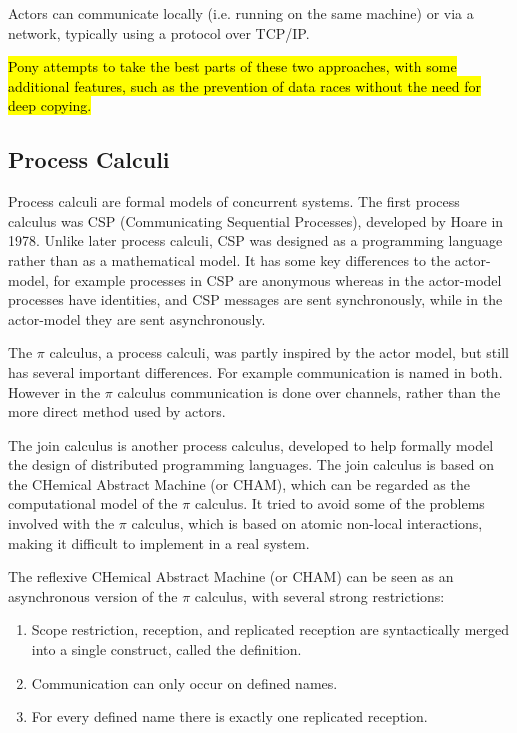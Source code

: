 \documentclass[11pt,a4paper]{report}
\begin{document}
Actors can communicate locally (i.e. running on the same machine) or via a network, typically using a protocol over TCP/IP.

\hl{Pony attempts to take the best parts of these two approaches, with some additional features, such as the prevention of data races without the need for deep copying.}

\subsection{Process Calculi}

Process calculi are formal models of concurrent systems.
The first process calculus was CSP (Communicating Sequential Processes), developed by Hoare in 1978\cite{hoare1978}.
Unlike later process calculi, CSP was designed as a programming language rather than as a mathematical model.
It has some key differences to the actor-model, for example processes in CSP are anonymous whereas in the actor-model processes have identities, and CSP messages are sent synchronously, while in the actor-model they are sent asynchronously.

The $\pi$ calculus\cite{milner1999communicating}, a process calculi, was partly inspired by the actor model, but still has several important differences.
For example communication is named in both.
However in the $\pi$ calculus communication is done over channels, rather than the more direct method used by actors.

The join calculus is another process calculus, developed to help formally model the design of distributed programming languages\cite{fournet1996}.
The join calculus is based on the CHemical Abstract Machine (or CHAM), which can be regarded as the computational model of the $\pi$ calculus.
It tried to avoid some of the problems involved with the $\pi$ calculus\cite{milner1989}, which is based on atomic non-local interactions, making it difficult to implement in a real system.

The reflexive CHemical Abstract Machine (or CHAM)\cite{fournet1996} can be seen as an asynchronous version of the $\pi$ calculus, with several strong restrictions:
\begin{enumerate}[noitemsep]
	\item Scope restriction, reception, and replicated reception are syntactically merged into a single construct, called the definition.
	\item Communication can only occur on defined names.
	\item For every defined name there is exactly one replicated reception.
\end{enumerate}
\end{document}

